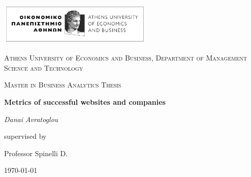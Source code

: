 \documentclass{article}
\begin{document}
\begin{titlepage}
	\centering
	\includegraphics[width=0.55\textwidth]{../R/photos/aueb.png}\par\vspace{1cm}
	{\scshape\LARGE Athens University of Economics and Business, Department of Management Science and Technology\par}
	\vspace{1cm}
	{\scshape\Large Master in Business Analytics Thesis\par}
	\vspace{1.5cm}
	{\huge\bfseries Metrics of successful websites and companies\par}
	\vspace{2cm}
	{\Large\itshape Danai Avratoglou\par}
	\vfill
	supervised by\par
	Professor Spinelli D. 

	\vfill

	{\large \today\par}
\end{titlepage}
\end{document}
